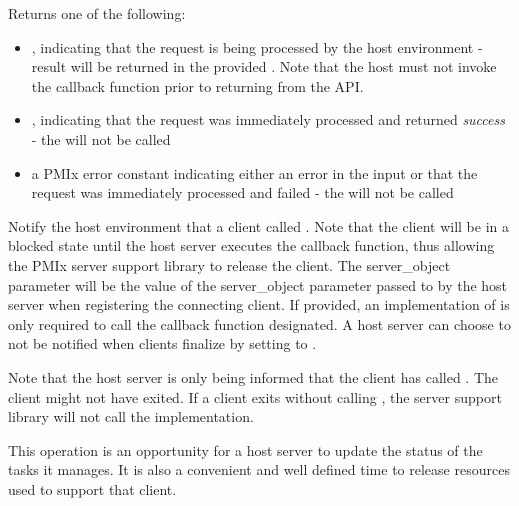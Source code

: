 Returns one of the following:

\begin{itemize}
    \item {}, indicating that the request is being processed by the host environment - result will be returned in the provided . Note that the host must not invoke the callback function prior to returning from the \ac{API}.
    \item {}, indicating that the request was immediately processed and returned \textit{success} - the  will not be called
    \item a PMIx error constant indicating either an error in the input or that the request was immediately processed and failed - the  will not be called
\end{itemize}

\descr

Notify the host environment that a client called .
Note that the client will be in a blocked state until the host server executes the callback function, thus allowing the PMIx server support library to release the client.
The server_object parameter will be the value of the server_object parameter passed to
 by the host server when registering the connecting client.  If provided, an implementation of 
is only required to
call the callback function designated.  A host server can choose to not be notified when clients finalize by setting  to .

Note that the host server is only being informed that the client has called .  The client might not have exited.  If a client
exits without calling , the server support library will not call the  implementation.

\advicermstart
This operation is an opportunity for a host server
to update the status of the tasks it manages.  It is also a convenient and well defined time to release resources used to support that client.
\advicermend


\subsection{}

